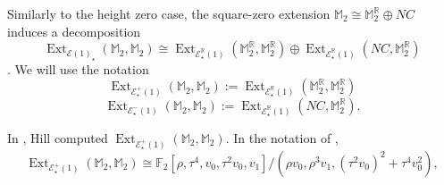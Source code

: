 \documentclass{amsart}
\theoremstyle{plain}
\numberwithin{equation}{section}
\numberwithin{figure}{section}
\DeclareMathOperator{\Ext}{Ext}
\newcommand{\mF}{{\mathbb F}}
\newcommand{\mM}{{\mathbb M}}
\newcommand{\mR}{{\mathbb R}}
\newcommand{\cE}{{\mathcal E}}
\newcommand{\0}{\langle 0 \rangle }
\begin{document}
Similarly to the height zero case, the square-zero extension $\mM_{2} \cong \mM_{2}^{\mR} \oplus NC$ induces a decomposition 
\[ \Ext_{\cE(1)_{\star}}(\mM_{2}, \mM_{2}) \cong \Ext_{\cE_{\star}^{\mR}(1)}(\mM_{2}^{\mR}, \mM_{2}^{\mR}) \oplus \Ext_{\cE_{\star}^{\mR}(1)}(NC, \mM_{2}^{\mR}) \]
\cite[Proposition~2.2]{GuillouHillIsaksenRavenel2020}. We will use the notation 
\[ \Ext_{\cE^{+}_{\star}(1)}(\mM_{2}, \mM_{2}) := \Ext_{\cE^{\mR}_{\star}(1)}(\mM_{2}^{\mR}, \mM_{2}^{\mR})\]
\[ \Ext_{\cE^{-}_{\star}(1)}(\mM_{2}, \mM_{2}) := \Ext_{\cE^{\mR}_{\star}(1)}(NC, \mM_{2}^{\mR}).\]

In \cite[Theorem~3.1]{Hill11}, Hill computed $\Ext_{\cE^{+}_{\star}(1)}(\mM_{2}, \mM_{2}) .$ In the notation of \cite[Proposition 6.3]{GuillouHillIsaksenRavenel2020},
\begin{equation}\label{eqn: Ext_mR}
    \Ext_{\cE^{+}_{\star}(1)}(\mM_{2}, \mM_{2})  \cong \mF_2 [\rho, \tau^4, v_0, \tau^2 v_0, v_1]/(\rho v_0, \rho^3 v_1, (\tau^2 v_0)^2 + \tau^4 v_0^2)
,
\end{equation}
\end{document}
